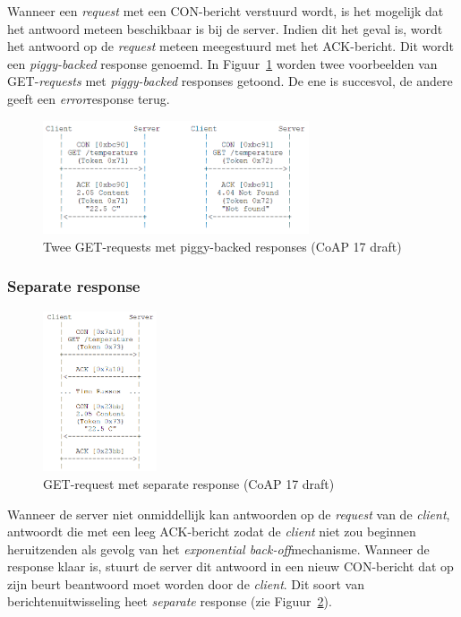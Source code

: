 Wanneer een \textit{request} met een CON-bericht verstuurd wordt, is het mogelijk dat het antwoord meteen beschikbaar is bij de server. Indien dit het geval is, wordt het antwoord op de \textit{request} meteen meegestuurd met het ACK-bericht. Dit wordt een \textit{piggy-backed} response genoemd. In Figuur~\ref{fig:CoAPPiggyBacked} worden twee voorbeelden van GET-\textit{requests} met \textit{piggy-backed} responses getoond. De ene is succesvol, de andere geeft een \textit{error}response terug.
\begin{figure}[h]
\vspace{10pt}
\centering
\includegraphics[width=0.7\textwidth]{fig/CoAPPiggyBacked}
\caption{Twee GET-requests met piggy-backed responses (CoAP 17 draft)}
\label{fig:CoAPPiggyBacked}
\vspace{-20pt}
\end{figure}

\newpage
\subsubsection{Separate response} \label{separate}

\begin{figure}
\vspace{-40pt}
\includegraphics[width=0.3\textwidth]{fig/CoAPSeperateResponse}
\vspace{-30pt}
\caption{GET-request met separate response (CoAP 17 draft)}
\label{fig:SeparateResponse}
\vspace{-100pt}
\end{figure}
Wanneer de server niet onmiddellijk kan antwoorden op de \textit{request} van de \textit{client}, antwoordt die met een leeg ACK-bericht zodat de \textit{client} niet zou beginnen heruitzenden als gevolg van het \textit{exponential back-off}mechanisme. Wanneer de response klaar is, stuurt de server dit antwoord in een nieuw CON-bericht dat op zijn beurt beantwoord moet worden door de \textit{client}. Dit soort van berichtenuitwisseling heet \textit{separate} response (zie Figuur~\ref{fig:SeparateResponse}).
\\
\\
\\

